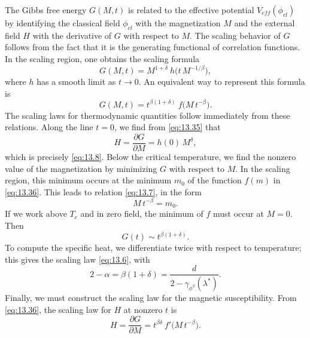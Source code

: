 The Gibbs free energy $G(M, t)$ is related to the effective potential
$V_{eff}(\phi_{cl})$ by identifying the classical field $\phi_{cl}$ with the
magnetization $M$ and the external field $H$ with the derivative of $G$ with
respect to $M$.  The scaling behavior of $G$ follows from the fact that it is
the generating functional of correlation functions.  In the scaling region,
one obtains the scaling formula
\begin{equation}
  G(M, t) = M^{1+\delta}\ h\bigl( t\,M^{-1/\beta} \bigr) ,
  \label{eq:13.35}
\end{equation}
where $h$ has a smooth limit as $t\to 0$.  An equivalent way to represent this
formula is
\begin{equation}
  G(M, t) = t^{\beta(1+\delta)}\ f\bigl( M\,t^{-\beta} \bigr) .
  \label{eq:13.36}
\end{equation}
The scaling laws for thermodynamic quantities follow immediately from these
relations.  Along the line $t = 0$, we find from \eqref{eq:13.35} that
\begin{equation}
  H = \frac{\partial G}{\partial M} = h(0)\,M^{\delta} ,
  \label{eq:13.37}
\end{equation}
which is precisely \eqref{eq:13.8}.  Below the critical temperature, we find
the nonzero value of the magnetization by minimizing $G$ with respect to
$M$.  In the scaling region, this minimum occurs at the minimum $m_0$ of the
function $f(m)$ in \eqref{eq:13.36}.  This leads to relation \eqref{eq:13.7},
in the form
\begin{equation}
  M\,t^{-\beta} = m_0 .
  \label{eq:13.38}
\end{equation}
If we work above $T_c$ and in zero field, the minimum of $f$ must occur at
$M = 0$.  Then
\begin{equation}
  G(t) \sim t^{\beta(1+\delta)} .
  \label{eq:13.39}
\end{equation}
To compute the specific heat, we differentiate twice with respect to
temperature; this gives the scaling law \eqref{eq:13.6}, with
\begin{equation}
  2 - \alpha = \beta(1+\delta) = \frac{d}{2 - \gamma_{\phi^2}(\lambda^{*})} .
  \label{eq:13.40}
\end{equation}
Finally, we must construct the scaling law for the magnetic susceptibility.
From \eqref{eq:13.36}, the scaling law for $H$ at nonzero $t$ is
\begin{equation}
  H = \frac{\partial G}{\partial M} = t^{\beta\delta}\ f'\bigl( M\,t^{-\beta}
    \bigr) .
  \label{eq:13.41}
\end{equation}
